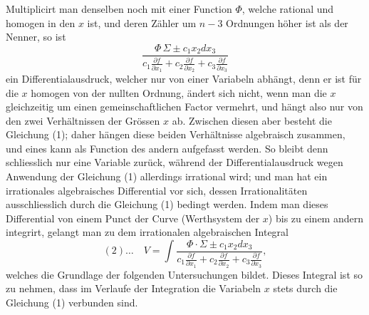 \documentclass[10pt]{article}
\begin{document}
Multiplicirt man denselben noch mit einer Function $\Phi$, welche rational und homogen in den $x$ ist, und deren Zähler um $n-3$ Ordnungen höher ist als der Nenner, so ist
\[
\frac{\Phi\,\Sigma\pm c_1x_2dx_3}{c_1\frac{\partial f}{\partial x_1}+c_2\frac{\partial f}{\partial x_2}+c_3\frac{\partial f}{\partial x_3}}
\]
ein Differentialausdruck, welcher nur von einer Variabeln abhängt, denn er ist für die $x$ homogen von der nullten Ordnung, ändert sich nicht, wenn man die $x$ gleichzeitig um einen gemeinschaftlichen Factor vermehrt, und hängt also nur von den zwei Verhältnissen der Grössen $x$ ab. Zwischen diesen aber besteht die Gleichung (1); daher hängen diese beiden Verhältnisse algebraisch zusammen, und eines kann als Function des andern aufgefasst werden. So bleibt denn schliesslich nur eine Variable zurück, während der Differentialausdruck wegen Anwendung der Gleichung (1) allerdings irrational wird; und man hat ein irrationales algebraisches Differential vor sich, dessen Irrationalitäten ausschliesslich durch die Gleichung (1) bedingt werden. Indem man dieses Differential von einem Punct der Curve (Werthsystem der $x$) bis zu einem andern integrirt, gelangt man zu dem irrationalen algebraischen Integral
\[
(2)\ldots\quad V=\int\frac{\Phi\cdot\Sigma\pm c_1x_2dx_3}{c_1\frac{\partial f}{\partial x_1}+c_2\frac{\partial f}{\partial x_2}+c_3\frac{\partial f}{\partial x_3}},
\]
welches die Grundlage der folgenden Untersuchungen bildet. Dieses Integral ist so zu nehmen, dass im Verlaufe der Integration die Variabeln $x$ stets durch die Gleichung (1) verbunden sind.
\end{document}

